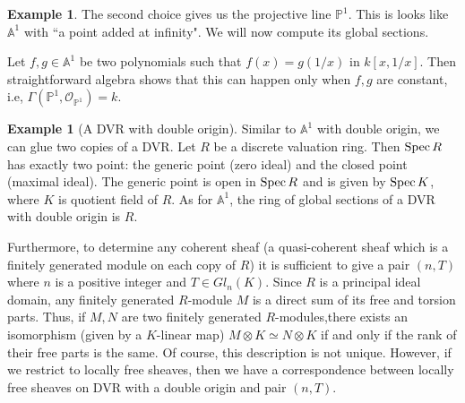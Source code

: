 \documentclass[11pt]{amsart}
\newcommand{\Spec}{{\rm Spec \,}}
\newcommand{\sO}{{\mathcal O}}
\newcommand{\A}{{\mathbb A}}
\renewcommand{\P}{{\mathbb P}}
\theoremstyle{definition}
\newtheorem{example}[theorem]{Example}
\begin{document}
\begin{example}\label{example-projective-line}
The second choice gives us the projective line $\P^1$. This is looks like $\A^1$ with ``a point added at infinity". We will now compute its global sections.

Let $f,g\in\A^1$ be two polynomials such that $f(x)=g(1/x)$ in $k[x,1/x]$. Then straightforward algebra shows that this can happen only when $f, g$ are constant, i.e, $\Gamma(\P^1,\sO_{\P^1})=k$.
\end{example}

\begin{example}[A DVR with double origin]
	\label{example-dvr-double-origin}
Similar to $\A^1$ with double origin, we can glue two copies of a DVR. Let $R$ be a discrete valuation ring. Then $\Spec R$ has exactly two point: the generic point (zero ideal) and the closed point (maximal ideal). The generic point is open in $\Spec R$ and is given by $\Spec K$, where $K$ is quotient field of $R$. As for $\A^1$, the ring of global sections of a DVR with double origin is $R$.

Furthermore, to determine any coherent sheaf (a quasi-coherent sheaf which is a finitely generated module on each copy of $R$) it is sufficient to give a pair $(n,T)$ where $n$ is a positive integer and $T\in Gl_n(K)$. Since $R$ is a principal ideal domain, any finitely generated $R$-module $M$ is a direct sum of its free and torsion parts. Thus, if $M, N$ are two finitely generated $R$-modules,there exists an isomorphism (given by a $K$-linear map) $M\otimes K \simeq N\otimes K$ if and only if the rank of their free parts is the same. Of course, this description is not unique. However, if we restrict to locally free sheaves, then we have a correspondence between locally free sheaves on DVR with a double origin and pair $(n,T)$.
\end{example}

\begin{comment}
\begin{tikzcd}[remember picture]
	A \arrow[r] & B\\
	C \arrow[r] & D\\
\end{tikzcd}
\begin{tikzpicture}[overlay,remember picture]
\path (\tikzcdmatrixname-2-1) to node[midway,sloped]{$\subseteq$}
(\tikzcdmatrixname-1-1);
\path (\tikzcdmatrixname-2-2) to node[midway,sloped]{$\subseteq$}
(\tikzcdmatrixname-1-2);
\end{tikzpicture}
\end{comment}
\end{document}
